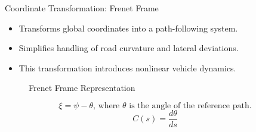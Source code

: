 \documentclass[shortpres,aspectratio=43]{beamer}
\begin{document}
\begin{frame}{Coordinate Transformation: Frenet Frame}
  \begin{itemize}
    \item Transforms global coordinates into a path-following system.
    \item Simplifies handling of road curvature and lateral deviations.
    \item This transformation introduces nonlinear vehicle dynamics.
  \end{itemize}
  \centering
  \begin{figure}[h]
    \centering
    \caption{Frenet Frame Representation}
  \end{figure}
  \begin{equation}
    \xi = \psi - \theta \text{, where $\theta$ is the angle of the reference path.}
  \end{equation}
  \begin{equation}
    C(s)=\frac{d\theta}{ds}
  \end{equation}
\end{frame}
\end{document}
